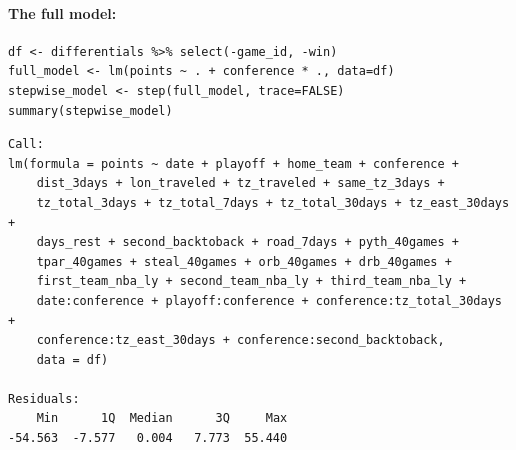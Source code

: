 \documentclass[
    12pt,
    a4paper,
    titlepage,  %
    abstract,  %
    headings=standardclasses,  %
    bibliography=totocnumbered  %
]{scrartcl}
\begin{document}
\paragraph{The full model:}

\begin{verbatim}
df <- differentials %>% select(-game_id, -win)
full_model <- lm(points ~ . + conference * ., data=df)
stepwise_model <- step(full_model, trace=FALSE)
summary(stepwise_model)
\end{verbatim}

\begin{Verbatim}
Call:
lm(formula = points ~ date + playoff + home_team + conference + 
    dist_3days + lon_traveled + tz_traveled + same_tz_3days + 
    tz_total_3days + tz_total_7days + tz_total_30days + tz_east_30days + 
    days_rest + second_backtoback + road_7days + pyth_40games + 
    tpar_40games + steal_40games + orb_40games + drb_40games + 
    first_team_nba_ly + second_team_nba_ly + third_team_nba_ly + 
    date:conference + playoff:conference + conference:tz_total_30days + 
    conference:tz_east_30days + conference:second_backtoback, 
    data = df)

Residuals:
    Min      1Q  Median      3Q     Max 
-54.563  -7.577   0.004   7.773  55.440 


\end{Verbatim}
\end{document}
